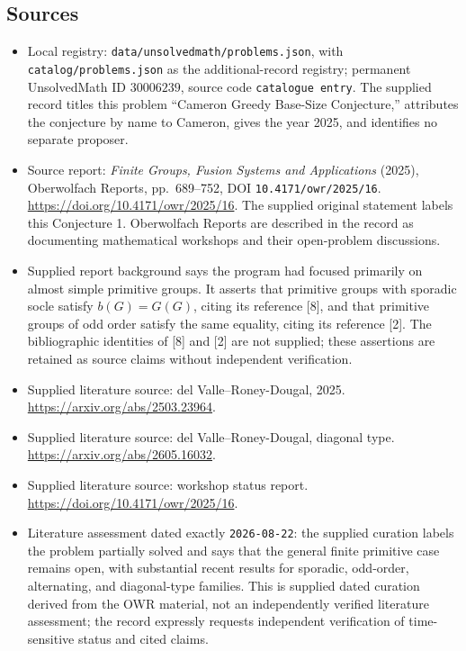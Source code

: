 \documentclass[11pt]{article}
\begin{document}
\subsection{Sources}
\begin{itemize}
\item Local registry: \texttt{data/unsolvedmath/problems.json}, with \texttt{catalog/problems.json} as the additional-record registry; permanent UnsolvedMath ID \(30006239\), source code \texttt{catalogue entry}. The supplied record titles this problem ``Cameron Greedy Base-Size Conjecture,'' attributes the conjecture by name to Cameron, gives the year 2025, and identifies no separate proposer.
\item Source report: \emph{Finite Groups, Fusion Systems and Applications} (2025), Oberwolfach Reports, pp.\ 689--752, DOI \texttt{10.4171/owr/2025/16}. \url{https://doi.org/10.4171/owr/2025/16}. The supplied original statement labels this Conjecture 1. Oberwolfach Reports are described in the record as documenting mathematical workshops and their open-problem discussions.
\item Supplied report background says the program had focused primarily on almost simple primitive groups. It asserts that primitive groups with sporadic socle satisfy \(b(G)=G(G)\), citing its reference [8], and that primitive groups of odd order satisfy the same equality, citing its reference [2]. The bibliographic identities of [8] and [2] are not supplied; these assertions are retained as source claims without independent verification.
\item Supplied literature source: del Valle--Roney-Dougal, 2025. \url{https://arxiv.org/abs/2503.23964}.
\item Supplied literature source: del Valle--Roney-Dougal, diagonal type. \url{https://arxiv.org/abs/2605.16032}.
\item Supplied literature source: workshop status report. \url{https://doi.org/10.4171/owr/2025/16}.
\item Literature assessment dated exactly \texttt{2026-08-22}: the supplied curation labels the problem partially solved and says that the general finite primitive case remains open, with substantial recent results for sporadic, odd-order, alternating, and diagonal-type families. This is supplied dated curation derived from the OWR material, not an independently verified literature assessment; the record expressly requests independent verification of time-sensitive status and cited claims.
\end{itemize}
\end{document}
